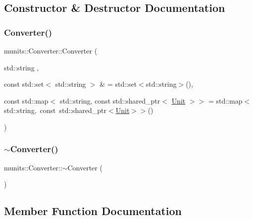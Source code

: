 \subsection{Constructor \& Destructor Documentation}
\mbox{\label{classmunits_1_1_converter_a047effa7046385a48cc7fa959a031823}} 
\subsubsection{\texorpdfstring{Converter()}{Converter()}}
{\footnotesize\ttfamily munits\+::\+Converter\+::\+Converter (\begin{DoxyParamCaption}\item[{std\+::string}]{,  }\item[{const std\+::set$<$ std\+::string $>$ \&}]{ = {\ttfamily std\+:\+:set$<$std\+:\+:string$>$()},  }\item[{const std\+::map$<$ std\+::string, const std\+::shared\+\_\+ptr$<$ \hyperlink{classmunits_1_1_unit}{Unit} $>$$>$}]{ = {\ttfamily std\+:\+:map$<$std\+:\+:string,~const~std\+:\+:shared\+\_\+ptr$<$\hyperlink{classmunits_1_1_unit}{Unit}$>$$>$()} }\end{DoxyParamCaption})\hspace{0.3cm}{\ttfamily [explicit]}}

\mbox{\label{classmunits_1_1_converter_acd1f8a562a9172c1593915798a9be4a8}} 
\subsubsection{\texorpdfstring{$\sim$\+Converter()}{~Converter()}}
{\footnotesize\ttfamily munits\+::\+Converter\+::$\sim$\+Converter (\begin{DoxyParamCaption}{ }\end{DoxyParamCaption})\hspace{0.3cm}{\ttfamily [inline]}}



\subsection{Member Function Documentation}
\mbox{\label{classmunits_1_1_converter_a58795a22d588dfebfe9ca62e47ea3cb9}} 
